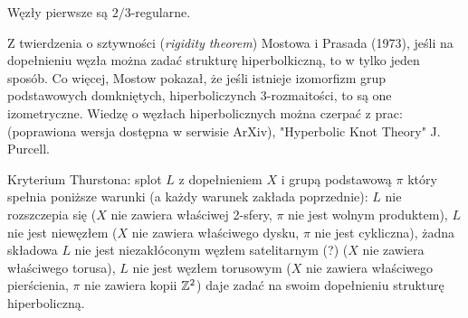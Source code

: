 \begin{conjecture}
    Węzły pierwsze są $2/3$-regularne.
\end{conjecture}



Z twierdzenia o sztywności (\emph{rigidity theorem}) Mostowa i Prasada (1973), jeśli na dopełnieniu węzła można zadać strukturę hiperbolkiczną, to w tylko jeden sposób.
Co więcej, Mostow pokazał, że jeśli istnieje izomorfizm grup podstawowych domkniętych, hiperboliczynch 3-rozmaitości, to są one izometryczne.
Wiedzę o węzłach hiperbolicznych można czerpać z prac: \cite{weeks05} (poprawiona wersja dostępna w serwisie ArXiv), "Hyperbolic Knot Theory" J. Purcell.

Kryterium Thurstona: splot $L$ z dopełnieniem $X$ i grupą podstawową $\pi$ który spełnia poniższe warunki (a każdy warunek zakłada poprzednie): $L$ nie rozszczepia się ($X$ nie zawiera właściwej 2-sfery, $\pi$ nie jest wolnym produktem), $L$ nie jest niewęzłem ($X$ nie zawiera właściwego dysku, $\pi$ nie jest cykliczna), żadna składowa $L$ nie jest niezakłóconym węzłem satelitarnym (?) ($X$ nie zawiera właściwego torusa), $L$ nie jest węzłem torusowym ($X$ nie zawiera właściwego pierścienia, $\pi$ nie zawiera kopii $\mathbb Z^2$) daje zadać na swoim dopełnieniu strukturę hiperboliczną.
